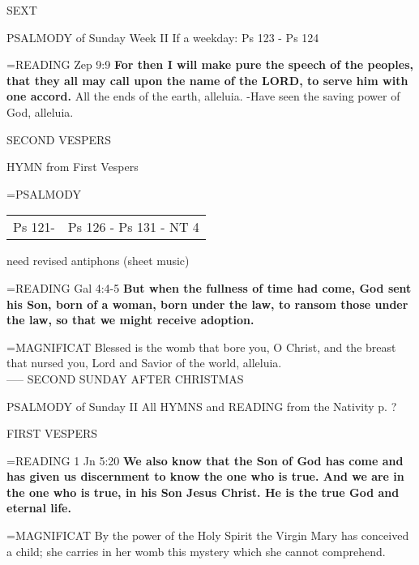 \begin{flushleft}\normalsize SEXT\\\end{flushleft}
PSALMODY of Sunday Week II
If a weekday: Ps 123 - Ps 124

\hangindent=\parindent \small{READING}    Zep 9:9 \textbf{   For then I will make pure the speech of the peoples, that they all may call upon the name of the LORD, to serve him with one accord.}
All the ends of the earth, alleluia.
-Have seen the saving power of God, alleluia.

\begin{flushleft}\normalsize SECOND VESPERS\\\end{flushleft}
HYMN from First Vespers

\hangindent=\parindent \small{PSALMODY}
\begin{center}
\begin{tabular}{ l l }
Ps 121- &  Ps 126 - Ps 131 - NT 4\\
\end{tabular}
\end{center}		

need revised antiphons (sheet music)

\hangindent=\parindent \small{READING}    Gal 4:4-5 \textbf{   But when the fullness of time had come, God sent his Son, born of a woman, born under the law, to ransom those under the law, so that we might receive adoption.\\}

\hangindent=\parindent \small{MAGNIFICAT 	Blessed is the womb that bore you, O Christ, and the breast that nursed you, Lord and Savior of the world, alleluia.\\}
-----
SECOND SUNDAY AFTER CHRISTMAS

PSALMODY of Sunday II
All HYMNS and READING from the Nativity p. ?

\begin{flushleft}\normalsize FIRST VESPERS\\\end{flushleft}

\hangindent=\parindent \small{READING}    1 Jn 5:20 \textbf{    We also know that the Son of God has come and has given us discernment to know the one who is true. And we are in the one who is true, in his Son Jesus Christ. He is the true God and eternal life.\\}

\hangindent=\parindent \small{MAGNIFICAT 	By the power of the Holy Spirit the Virgin Mary has conceived a child; she carries in her womb this mystery which she cannot comprehend.\\}

